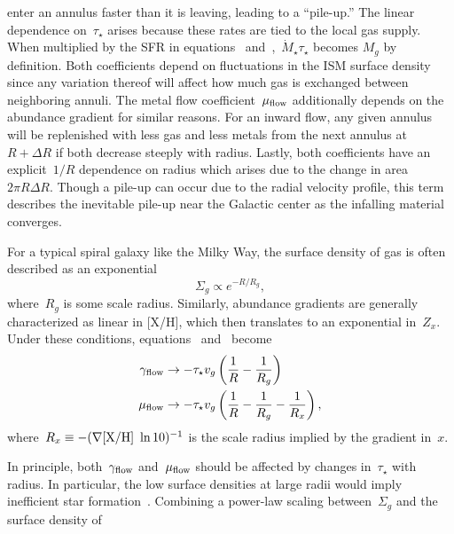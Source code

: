 enter an annulus faster than it is leaving, leading to a ``pile-up.''
The linear dependence on~$\tau_\star$ arises because these rates are tied to
the local gas supply.
When multiplied by the SFR in equations~
and~,~$\dot{M}_\star \tau_\star$ becomes
$M_g$ by definition.
Both coefficients depend on fluctuations in the ISM surface density since any
variation thereof will affect how much gas is exchanged between neighboring
annuli.
The metal flow coefficient~$\mu_{\text{flow}}$ additionally depends on the abundance
gradient for similar reasons.
For an inward flow, any given annulus will be replenished with less gas and
less metals from the next annulus at~$R + \Delta R$ if both decrease steeply
with radius.
Lastly, both coefficients have an explicit~$1 / R$ dependence on radius which
arises due to the change in area~$2 \pi R \Delta R$.
Though a pile-up can occur due to the radial velocity profile, this term
describes the inevitable pile-up near the Galactic center as the infalling
material converges.
\par
For a typical spiral galaxy like the Milky Way, the surface density of gas is
often described as an exponential
\begin{equation}
\Sigma_g \propto e^{-R / R_g},
\end{equation}
where~$R_g$ is some scale radius.
Similarly, abundance gradients are generally characterized as linear in [X/H],
which then translates to an exponential in~$Z_x$.
Under these conditions, equations~
and~ become
\begin{subequations}\begin{align}
\gamma_{\text{flow}} &\rightarrow -\tau_\star v_g
\left(\frac{1}{R} - \frac{1}{R_g}\right)
\label{outflows:eq:gamma-flow}
\\
\mu_{\text{flow}} &\rightarrow -\tau_\star v_g
\left(\frac{1}{R} - \frac{1}{R_g} - \frac{1}{R_x}\right),
\label{outflows:eq:mu-flow}
\end{align}\end{subequations}
where~$R_x \equiv -(\nabla\text{[X/H]}~\ln 10)^{-1}$ is the scale radius implied by the
gradient in~$x$.
\par
In principle, both~$\gamma_{\text{flow}}$ and~$\mu_{\text{flow}}$ should be affected by changes
in~$\tau_\star$ with radius.
In particular, the low surface densities at large radii would imply inefficient
star formation~\citep[i.e., higher~$\tau_\star$; e.g.,][]{delosReyes2019,
Kennicutt2021}.
Combining a power-law scaling between~$\Sigma_g$ and the surface density of
